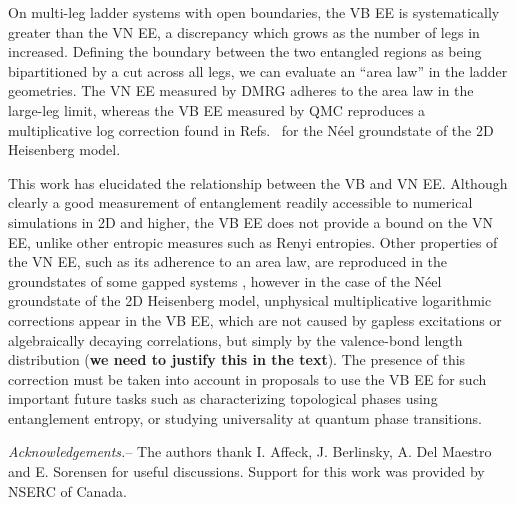 \documentclass[prl,aps,twocolumn,floatfix,amsmath,amssymb,superscriptaddress,tightenlines]{revtex4}
\begin{document}
On multi-leg ladder systems with open boundaries, the VB EE is
systematically greater than the VN EE, a discrepancy which grows as the
number of legs in increased.  Defining the boundary between the two
entangled regions as being bipartitioned by a cut across all legs, we can
evaluate an ``area law'' in the ladder geometries.  The VN EE measured by
DMRG adheres to the area law in the large-leg limit, whereas the VB EE
measured by QMC reproduces a multiplicative log correction found in
Refs.~\cite{Alet,Chh} for the N\'eel groundstate of the 2D Heisenberg
model.

This work has elucidated the relationship between the VB and VN EE.
Although clearly a good measurement of entanglement readily accessible to
numerical simulations in 2D and higher, the VB EE does not provide a bound
on the VN EE, unlike other entropic measures such as Renyi entropies.
Other properties of the VN EE, such as its adherence to an area law, are
reproduced in the groundstates of some gapped systems \cite{Alet,Chh},
however in the case of the N\'eel groundstate of the 2D Heisenberg model,
unphysical multiplicative logarithmic corrections appear in the VB EE,
which are not caused by gapless excitations or algebraically decaying
correlations, but simply by the valence-bond length distribution ({\bf we
need to justify this in the text}).  The presence of this correction must
be taken into account in proposals to use the VB EE for such important
future tasks such as characterizing topological phases using entanglement
entropy, or studying universality at quantum phase transitions.

{\it Acknowledgements.}-- The authors thank I. Affeck, J. Berlinsky, A.
Del Maestro and E. Sorensen for useful discussions.  Support for this work
was provided by NSERC of Canada.



\end{document}
